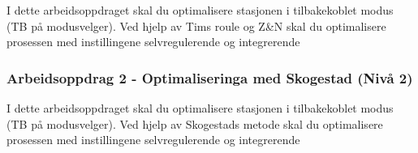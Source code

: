 I dette arbeidsoppdraget skal du optimalisere stasjonen i tilbakekoblet modus (TB på modusvelger). Ved hjelp av Tims roule og Z\&N skal du optimalisere prosessen med instillingene selvregulerende og integrerende

\subsubsection*{Arbeidsoppdrag 2 - Optimaliseringa med Skogestad (Nivå 2)}


I dette arbeidsoppdraget skal du optimalisere stasjonen i tilbakekoblet modus (TB på modusvelger). Ved hjelp av Skogestads metode skal du optimalisere prosessen med instillingene selvregulerende og integrerende



